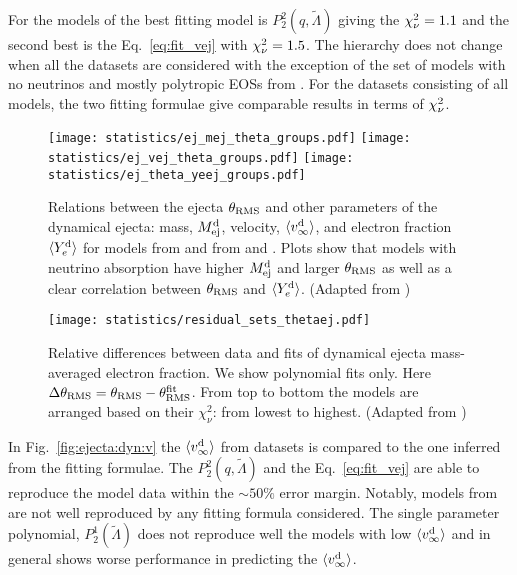 For the models of \DSrefset{} the best fitting model is $P_2^2(q,\tilde\Lambda)$ giving the 
$\chi_{\nu}^2=1.1$ and the second best is the Eq.~\eqref{eq:fit_vej} with $\chi_{\nu}^2=1.5$.
The hierarchy does not change when all the datasets are considered with the exception 
of the set of models with no neutrinos and mostly polytropic \acp{EOS} from \citet{Bauswein:2013yna}.
For the datasets consisting of all models, the two fitting formulae give comparable results 
in terms of $\chi_{\nu}^2$.

\begin{figure*}[t]
    \centering 
    \texttt{[image: statistics/ej\_mej\_theta\_groups.pdf]}
    \texttt{[image: statistics/ej\_vej\_theta\_groups.pdf]}
    \texttt{[image: statistics/ej\_theta\_yeej\_groups.pdf]}
    \caption{
        Relations between the ejecta $\theta_{\rm RMS}$ and other parameters of the dynamical
        ejecta: mass, $M^{\text{d}}_{\text{ej}}$, velocity, $\langle v^{\text{d}}_\infty\rangle$, and electron fraction $\langle Y^{\text{d}}_{e}\rangle$ for models from
        \DSrefset{} and \cite{Radice:2018pdn} from \DScool{} and \DSheatcool{}.
        Plots show that models with neutrino absorption have
        higher $M^{\text{d}}_{\text{ej}}$ and larger $\theta_{\rm RMS}$ as well as 
        a clear correlation between $\theta_{\rm RMS}$ and $\langle Y^{\text{d}}_{e}\rangle$.
        (Adapted from \citet{Nedora:2020qtd})
    }
    \label{fig:ejecta:dynej_thetarms}
\end{figure*}

\begin{figure}[t]
    \centering 
    \texttt{[image: statistics/residual\_sets\_thetaej.pdf]}
    \caption{
        Relative differences between data and fits of dynamical
        ejecta mass-averaged electron fraction.
        We show polynomial fits only.
        Here $\Delta \theta_{\rm RMS} = \theta_{\rm RMS} - \theta^{\rm fit}_{\rm RMS}$.
        From top to bottom the models are arranged based on their $\chi_{\nu}^2$: from lowest to highest.
        (Adapted from \citet{Nedora:2020qtd})
    }
    \label{fig:ejecta:dyn:theta}
\end{figure}

In Fig.~\ref{fig:ejecta:dyn:v} the $\langle v^{\text{d}}_\infty\rangle$ from datasets is compared to the one inferred from the
fitting formulae. 
The $P_2^2(q,\tilde\Lambda)$ and the Eq.~\eqref{eq:fit_vej} are able to reproduce the model data 
within the $\sim50\%$ error margin. Notably, models from \DSnone{} are not well reproduced by 
any fitting formula considered.
The single parameter polynomial, $P_2^1(\tilde\Lambda)$ does not reproduce well the models with 
low $\langle v^{\text{d}}_\infty\rangle$ and in general shows worse performance in predicting the $\langle v^{\text{d}}_\infty\rangle$.

